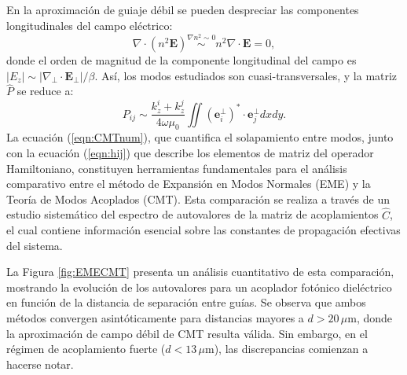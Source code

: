 En la aproximación de guiaje débil se pueden despreciar las componentes longitudinales del campo eléctrico:
\[ \nabla \cdot (n^2 \textbf{E}) \overset{\nabla n^2 \sim 0}{\sim} n^2 \nabla \cdot \textbf{E} = 0,\]
donde el orden de magnitud de la componente longitudinal del campo es $|E_z| \sim |\nabla_\perp \cdot \textbf{E}_\perp|/\beta$. Así, los modos estudiados son cuasi-transversales, y la matriz $\hat{P}$ se reduce a:
\begin{equation}
    P_{ij} \sim \frac{k_z^i + k_z^j}{4\omega\mu_0} \iint \left(\textbf{e}_i^\perp\right)^* \cdot \textbf{e}_j^\perp dxdy.
    \label{eqn:CMTnum}
\end{equation}
La ecuación (\ref{eqn:CMTnum}), que cuantifica el solapamiento entre modos, junto con la ecuación (\ref{eqn:hij}) que describe los elementos de matriz del operador Hamiltoniano, constituyen herramientas fundamentales para el análisis comparativo entre el método de Expansión en Modos Normales (EME) y la Teoría de Modos Acoplados (CMT). Esta comparación se realiza a través de un estudio sistemático del espectro de autovalores de la matriz de acoplamientos $\hat{C}$, el cual contiene información esencial sobre las constantes de propagación efectivas del sistema. 

La Figura \ref{fig:EMECMT} presenta un análisis cuantitativo de esta comparación, mostrando la evolución de los autovalores para un acoplador fotónico dieléctrico en función de la distancia de separación entre guías. Se observa que ambos métodos convergen asintóticamente para distancias mayores a $d > 20\,\mu$m, donde la aproximación de campo débil de CMT resulta válida. Sin embargo, en el régimen de acoplamiento fuerte ($d < 13\,\mu$m), las discrepancias comienzan a hacerse notar.

